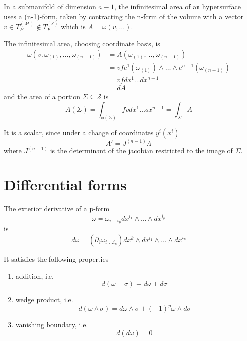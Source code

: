     In a submanifold of dimension $n-1$, the infinitesimal area of an hypersurface uses a (n-1)-form, taken by contracting the n-form of the volume with a vector $v \in T_P^{(\mathcal M)} \notin T_P^{(\mathcal S)}$ which is $A = \omega(v, \ldots)$. 

    The infinitesimal area, choosing coordinate basis, is
    \begin{equation*}
    \begin{aligned}
        \omega (v, \omega_{(1)}, \ldots, \omega_{(n-1)}) & = A(\omega_{(1)}, \ldots, \omega_{(n-1)}) \\ & = v f e^1(\omega_{(1)}) \wedge \ldots \wedge e^{n-1} (\omega_{(n-1)}) \\ & = v f dx^1 \ldots dx^{n-1} \\ & = dA
    \end{aligned}
    \end{equation*}
    and the area of a portion $\Sigma \subseteq \mathcal S$ is 
    \begin{equation*}
        A(\Sigma) = \int_{\phi(\Sigma)} f v dx^1 \ldots dx^{n-1} = \int_{\Sigma} A
    \end{equation*}

    
    It is a scalar, since under a change of coordinates $y^i(x^i)$
    \begin{equation*}
        A' = J^{(n-1)}A
    \end{equation*}
    where $J^{(n-1)}$ is the determinant of the jacobian restricted to the image of $\Sigma$. 

\section{Differential forms}

    The exterior derivative of a p-form 
    \begin{equation*}
        \omega = \omega_{i_1 \ldots i_p} dx^{i_1} \wedge \ldots \wedge dx^{i_p}
    \end{equation*}
    is 
    \begin{equation*}
        d \omega = (\partial_k \omega_{i_1 \ldots i_p}) dx^k \wedge dx^{i_1} \wedge \ldots \wedge dx^{i_p}
    \end{equation*}

    It satisfies the following properties 
    \begin{enumerate}
        \item addition, i.e.
            \begin{equation*}
                d(\omega + \sigma) = d\omega + d\sigma
            \end{equation*}
        \item wedge product, i.e.
            \begin{equation*}
                d(\omega \wedge \sigma) = d\omega \wedge \sigma + (-1)^p \omega \wedge d\sigma
            \end{equation*}
        \item vanishing boundary, i.e.
            \begin{equation*}
                d (d\omega) = 0
            \end{equation*}
    \end{enumerate}


